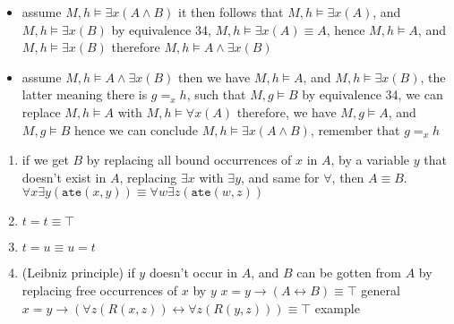 \documentclass[a4paper, 12pt]{article}
\begin{document}
                \begin{itemize}
                    \itemsep0em
                    \item assume $M, h \vDash \exists x (A \land B)$
                        \subitem it then follows that $M, h \vDash \exists x (A)$, and $M, h \vDash \exists x (B)$
                        \subitem by equivalence 34, $M, h \vDash \exists x (A) \equiv A$, hence $M, h \vDash A$, and $M, h \vDash \exists x (B)$
                        \subitem therefore $M, h \vDash A \land \exists x (B)$
                    \item assume $M, h \vDash A \land \exists x (B)$
                        \subitem then we have $M, h \vDash A$, and $M, h \vDash \exists x (B)$, the latter meaning there is $g =_x h$, such that $M, g \vDash B$
                        \subitem by equivalence 34, we can replace $M, h \vDash A$ with $M, h \vDash \forall x (A)$
                        \subitem therefore, we have $M, g \vDash A$, and $M, g \vDash B$
                        \subitem hence we can conclude $M, h \vDash \exists x (A \land B)$, remember that $g =_x h$
                \end{itemize}
                \begin{enumerate}[1.]
                    \itemsep0em
                    \setcounter{enumi}{37}
                    \item if we get $B$ by replacing all bound occurrences of $x$ in $A$, by a variable $y$ that doesn't exist in $A$, replacing $\exists x$ with $\exists y$, and same for $\forall$, then $A \equiv B$. \hfill $\forall x \exists y (\texttt{ate}(x, y)) \equiv \forall w \exists z (\texttt{ate}(w, z))$
                    \item $t = t \equiv \top$
                    \item $t = u \equiv u = t$
                    \item (Leibniz principle) if $y$ doesn't occur in $A$, and $B$ can be gotten from $A$ by replacing free occurrences of $x$ by $y$
                        \subitem $x = y \rightarrow (A \leftrightarrow B) \equiv \top$ \hfill general
                        \subitem $x = y \rightarrow (\forall z (R(x, z)) \leftrightarrow \forall z (R(y, z))) \equiv \top$ \hfill example
                \end{enumerate}
\end{document}
